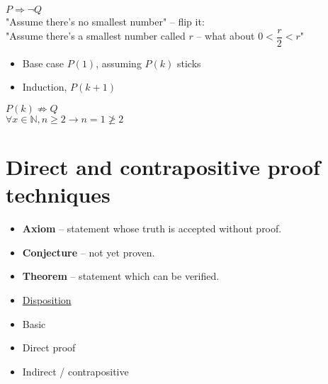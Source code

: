 \documentclass[english,10pt,a4paper]{article}
\begin{document}
\begin{theo}[Contradiction] 
 $P \Rightarrow \neg Q$\\
"Assume there's no smallest number" -- flip it:\\
"Assume there's a smallest number called $r$ -- what about $0 < \dfrac{r}{2} < r$"
\end{theo}


\begin{theo}[Induction] 
\begin{itemize}
\item Base case $P(1)$, assuming $P(k)$ sticks
\item Induction, $P(k+1)$
\end{itemize}
\end{theo}


\begin{theo} 
$P(k) \not \Rightarrow Q$\\
$\forall x \in \mathbb{N}, n \geq 2 \rightarrow n= 1 \not \geq 2$
\end{theo}



\newpage
\section{Direct and contrapositive proof  techniques}

\begin{minipage}[t]{0.7\linewidth}
\begin{theo}[Basic] 
\begin{itemize}
\item \textbf{Axiom} -- statement whose truth is accepted without proof.
\item \textbf{Conjecture} -- not yet proven.
\item \textbf{Theorem} -- statement which can be verified. 
\end{itemize}
\end{theo}
\end{minipage}
\hspace{0.1cm}
\begin{minipage}[t]{0.25\linewidth}
\begin{itemize}
\item[] \underline{Disposition}
\item Basic
\item Direct proof
\item Indirect / contrapositive
\end{itemize}
\end{minipage}
\end{document}
